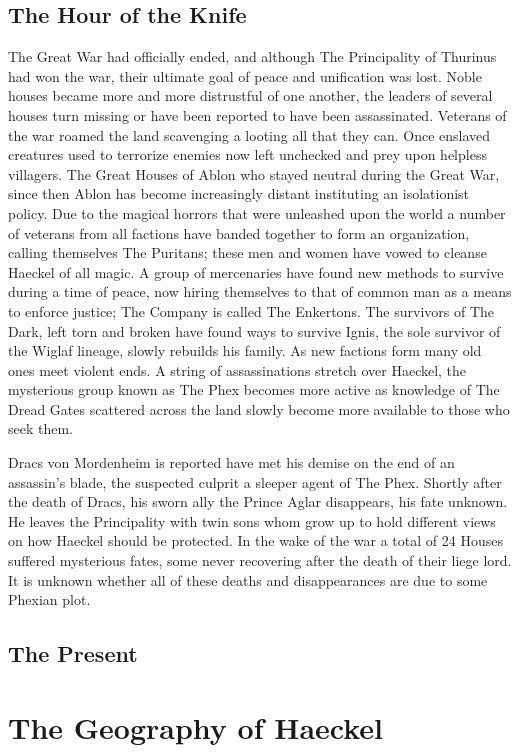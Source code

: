 \begin{multicols}{2}
\subsection{The Hour of the Knife} The Great War had officially ended, and although The Principality of Thurinus had won the war, their ultimate goal of peace and unification was lost. Noble houses became more and more distrustful of one another, the leaders of several houses turn missing or have been reported to have been assassinated. Veterans of the war roamed the land scavenging a looting all that they can. Once enslaved creatures used to terrorize enemies now left unchecked and prey upon helpless villagers. The Great Houses of Ablon who stayed neutral during the Great War, since then Ablon has become increasingly distant instituting an isolationist policy. Due to the magical horrors that were unleashed upon the world a number of veterans from all factions have banded together to form an organization, calling themselves The Puritans; these men and women have vowed to cleanse Haeckel of all magic. A group of mercenaries have found new methods to survive during a time of peace, now hiring themselves to that of common man as a means to enforce justice; The Company is called The Enkertons. The survivors of The Dark, left torn and broken have found ways to survive Ignis, the sole survivor of the Wiglaf lineage, slowly rebuilds his family. As new factions form many old ones meet violent ends. A string of assassinations stretch over Haeckel, the mysterious group known as The Phex becomes more active as knowledge of The Dread Gates scattered across the land slowly become more available to those who seek them.

Dracs von Mordenheim is reported have met his demise on the end of an assassin’s blade, the suspected culprit a sleeper agent of The Phex. Shortly after the death of Dracs, his sworn ally the Prince Aglar disappears, his fate unknown. He leaves the Principality with twin sons whom grow up to hold different views on how Haeckel should be protected. In the wake of the war a total of 24 Houses suffered mysterious fates, some never recovering after the death of their liege lord. It is unknown whether all of these deaths and disappearances are due to some Phexian plot.

\subsection{The Present} 

\section{The Geography of Haeckel}


\end{multicols}
